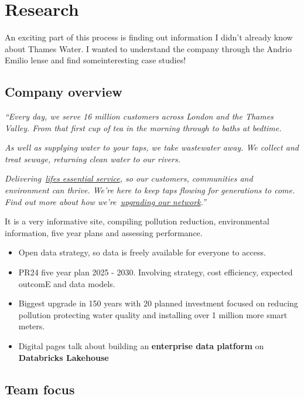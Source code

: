\documentclass[
  letterpaper,
]{scrbook}
\begin{document}

\chapter{Research}\label{research}

An exciting part of this process is finding out information I didn't
already know about Thames Water. I wanted to understand the company
through the Andrio Emilio lense and find someinteresting case studies!

\section{Company overview}\label{company-overview}

\emph{``Every day, we serve 16 million customers across London and the
Thames Valley. From that first cup of tea in the morning through to
baths at bedtime.}

\emph{As well as supplying water to your taps, we take wastewater away.
We collect and treat sewage, returning clean water to our rivers.}

\emph{Delivering~\href{https://www.thameswater.co.uk/about-us/thames-water-explained}{life\textquotesingle s
essential service}, so our customers, communities and environment can
thrive. We're here to keep taps flowing for generations to come. Find
out more about how
we're~\href{https://www.thameswater.co.uk/about-us/our-biggest-upgrade}{upgrading
our network}.''}

It is a very informative site, compiling pollution reduction,
environmental information, five year plans and assessing performance.

\begin{itemize}
\item
  Open data strategy, so data is freely available for everyone to
  access.
\item
  PR24 five year plan 2025 - 2030. Involving strategy, cost efficiency,
  expected outcomE and data models.
\item
  Biggest upgrade in 150 years with 20 planned investment focused on
  reducing pollution protecting water quality and installing over 1
  million more smart meters.
\item
  Digital pages talk about building an \textbf{enterprise data platform}
  on \textbf{Databricks Lakehouse}
\end{itemize}

\section{Team focus}\label{team-focus}
\end{document}

